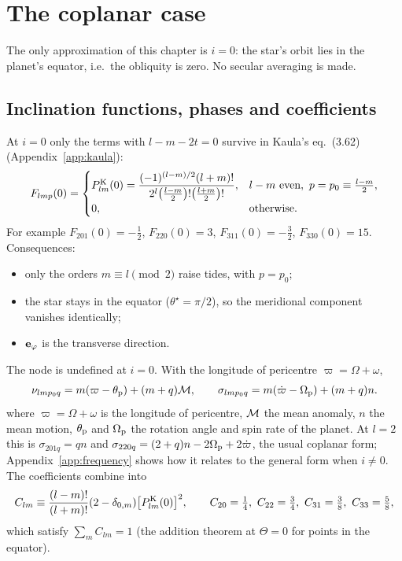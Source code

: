 \chapter{The coplanar case}\label{ch:coplanar}

The only approximation of this chapter is $i=0$: the star's orbit lies in the planet's equator, i.e.\ the obliquity is zero. No secular averaging is made.

\section{Inclination functions, phases and coefficients}
At $i=0$ only the terms with $l-m-2t=0$ survive in Kaula's eq.~(3.62) (Appendix~\ref{app:kaula}):
\begin{equation}
  F_{lmp}(0)=\begin{cases}\PK_{lm}(0)=\dfrac{(-1)^{(l-m)/2}(l+m)!}{2^l\big(\frac{l-m}{2}\big)!\big(\frac{l+m}{2}\big)!},& l-m\ \text{even},\ p=p_0\equiv\frac{l-m}{2},\\[2mm]0,&\text{otherwise}.\end{cases} \label{eq:F0}
\end{equation}
For example $F_{201}(0)=-\tfrac12$, $F_{220}(0)=3$, $F_{311}(0)=-\tfrac32$, $F_{330}(0)=15$. Consequences:
\begin{itemize}
  \item only the orders $m\equiv l\pmod2$ raise tides, with $p=p_0$;
  \item the star stays in the equator ($\theta^\star=\pi/2$), so the meridional component vanishes identically;
  \item $\mathbf e_\varphi$ is the transverse direction.
\end{itemize}
The node is undefined at $i=0$. With the longitude of pericentre $\varpi=\Omega+\omega$,
\begin{equation}
  \nu_{lmp_0q}=m(\varpi-\theta_{\mathrm p})+(m+q)\mathcal{M},\qquad \sigma_{lmp_0q}=m(\dot\varpi-\Omega_{\mathrm p})+(m+q)n. \label{eq:nu-coplanar}
\end{equation}
where $\varpi=\Omega+\omega$ is the longitude of pericentre, $\mathcal{M}$ the mean anomaly, $n$ the mean motion, $\theta_{\mathrm p}$ and $\Omega_{\mathrm p}$ the rotation angle and spin rate of the planet. At $l=2$ this is $\sigma_{201q}=qn$ and $\sigma_{220q}=(2+q)n-2\Omega_{\mathrm p}+2\dot\varpi$, the usual coplanar form; Appendix~\ref{app:frequency} shows how it relates to the general form when $i\neq0$.
The coefficients combine into
\begin{equation}
  C_{lm}\equiv\frac{(l-m)!}{(l+m)!}(2-\delta_{0,m})\big[P^{\mathrm K}_{lm}(0)\big]^2,\qquad C_{20}=\tfrac14,\ C_{22}=\tfrac34,\ C_{31}=\tfrac38,\ C_{33}=\tfrac58, \label{eq:Clm}
\end{equation}
which satisfy $\sum_mC_{lm}=1$ (the addition theorem at $\Theta=0$ for points in the equator).

